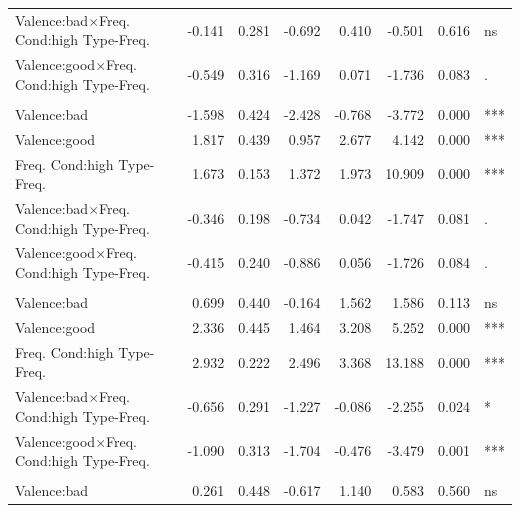 \documentclass[
]{article}
\begin{document}
\begin{longtable}[t]{lrrrrrrl}
Valence:bad$\times$Freq.
Cond:high
\hspace{1em}Type-Freq. & -0.141 & 0.281 & -0.692 & 0.410 & -0.501 & 0.616 & ns\\
Valence:good$\times$Freq.
Cond:high
\hspace{1em}Type-Freq. & -0.549 & 0.316 & -1.169 & 0.071 & -1.736 & 0.083 & .\\
\addlinespace[0.3em]
\multicolumn{8}{l}{\textbf{Third Party Acceptability - Testable}}\\
\hspace{1em}Valence:bad & -1.598 & 0.424 & -2.428 & -0.768 & -3.772 & 0.000 & ***\\
\hspace{1em}Valence:good & 1.817 & 0.439 & 0.957 & 2.677 & 4.142 & 0.000 & ***\\
Freq.
Cond:high
\hspace{1em}Type-Freq. & 1.673 & 0.153 & 1.372 & 1.973 & 10.909 & 0.000 & ***\\
Valence:bad$\times$Freq.
Cond:high
\hspace{1em}Type-Freq. & -0.346 & 0.198 & -0.734 & 0.042 & -1.747 & 0.081 & .\\
Valence:good$\times$Freq.
Cond:high
\hspace{1em}Type-Freq. & -0.415 & 0.240 & -0.886 & 0.056 & -1.726 & 0.084 & .\\
\addlinespace[0.3em]
\multicolumn{8}{l}{\textbf{Prevalence - Students}}\\
\hspace{1em}Valence:bad & 0.699 & 0.440 & -0.164 & 1.562 & 1.586 & 0.113 & ns\\
\hspace{1em}Valence:good & 2.336 & 0.445 & 1.464 & 3.208 & 5.252 & 0.000 & ***\\
Freq.
Cond:high
\hspace{1em}Type-Freq. & 2.932 & 0.222 & 2.496 & 3.368 & 13.188 & 0.000 & ***\\
Valence:bad$\times$Freq.
Cond:high
\hspace{1em}Type-Freq. & -0.656 & 0.291 & -1.227 & -0.086 & -2.255 & 0.024 & *\\
Valence:good$\times$Freq.
Cond:high
\hspace{1em}Type-Freq. & -1.090 & 0.313 & -1.704 & -0.476 & -3.479 & 0.001 & ***\\
\addlinespace[0.3em]
\multicolumn{8}{l}{\textbf{Prevalence - Testable}}\\
\hspace{1em}Valence:bad & 0.261 & 0.448 & -0.617 & 1.140 & 0.583 & 0.560 & ns\\

\end{longtable}
\end{document}
